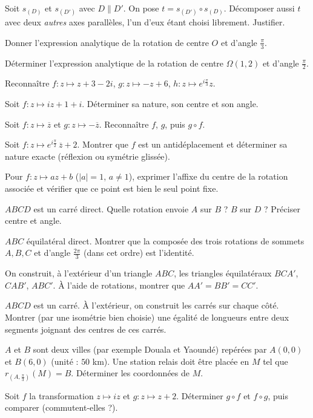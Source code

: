 \exo{} Soit $s_{(D)}$ et $s_{(D')}$ avec $D\parallel D'$. On pose $t=s_{(D')}\circ s_{(D)}$. Décomposer aussi $t$ avec deux \emph{autres} axes parallèles, l'un d'eux étant choisi librement. Justifier.

\exo{} Donner l'expression analytique de la rotation de centre $O$ et d'angle $\frac\pi3$.

\exo{} Déterminer l'expression analytique de la rotation de centre $\Omega(1,2)$ et d'angle $\frac\pi2$.

\exo{} Reconnaître $f:z\mapsto z+3-2i$, $g:z\mapsto -z+6$, $h:z\mapsto e^{i\frac\pi3}z$.

\exo{} Soit $f:z\mapsto iz+1+i$. Déterminer sa nature, son centre et son angle.

\exo{} Soit $f:z\mapsto \overline z$ et $g:z\mapsto -\overline z$. Reconnaître $f$, $g$, puis $g\circ f$.

\exo{} Soit $f:z\mapsto e^{i\frac\pi2}\,\overline z+2$. Montrer que $f$ est un antidéplacement et déterminer sa nature exacte (réflexion ou symétrie glissée).

\exo{} Pour $f:z\mapsto az+b$ ($|a|=1$, $a\neq1$), exprimer l'affixe du centre de la rotation associée et vérifier que ce point est bien le seul point fixe.

\exo{} $ABCD$ est un carré direct. Quelle rotation envoie $A$ sur $B$ ? $B$ sur $D$ ? Préciser centre et angle.

\exo{} $ABC$ équilatéral direct. Montrer que la composée des trois rotations de sommets $A,B,C$ et d'angle $\frac{2\pi}3$ (dans cet ordre) est l'identité.

\exo{} On construit, à l'extérieur d'un triangle $ABC$, les triangles équilatéraux $BCA'$, $CAB'$, $ABC'$. À l'aide de rotations, montrer que $AA'=BB'=CC'$.

\exo{} $ABCD$ est un carré. À l'extérieur, on construit les carrés sur chaque côté. Montrer (par une isométrie bien choisie) une égalité de longueurs entre deux segments joignant des centres de ces carrés.

\exo{} $A$ et $B$ sont deux villes (par exemple Douala et Yaoundé) repérées par $A(0,0)$ et $B(6,0)$ (unité : $50$ km). Une station relais doit être placée en $M$ tel que $r_{(A,\frac\pi3)}(M)=B$. Déterminer les coordonnées de $M$.

\exo{} Soit $f$ la transformation $z\mapsto iz$ et $g:z\mapsto z+2$. Déterminer $g\circ f$ et $f\circ g$, puis comparer (commutent-elles ?).

